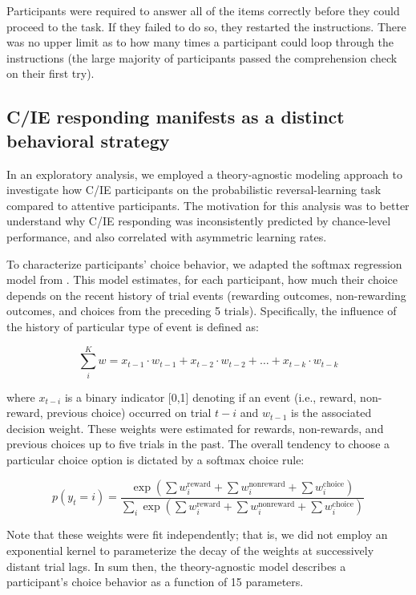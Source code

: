 \documentclass[a4paper,notitlepage,12pt]{article}
\begin{document}
Participants were required to answer all of the items correctly before they could proceed to the task. If they failed to do so, they restarted the instructions. There was no upper limit as to how many times a participant could loop through the instructions (the large majority of participants passed the comprehension check on their first try).

\subsection*{C/IE responding manifests as a distinct behavioral strategy}

In an exploratory analysis, we employed a theory-agnostic modeling approach to investigate how C/IE participants on the probabilistic reversal-learning task compared to attentive participants. The motivation for this analysis was to better understand why C/IE responding was inconsistently predicted by chance-level performance, and also correlated with asymmetric learning rates.  

To characterize participants' choice behavior, we adapted the softmax regression model from \cite{seymour2012serotonin}. This model estimates, for each participant, how much their choice depends on the recent history of trial events (rewarding outcomes, non-rewarding outcomes, and choices from the preceding 5 trials). Specifically, the influence of the history of particular type of event is defined as:

\begin{equation*}
    \sum_i^K w = x_{t-1} \cdot w_{t-1} + x_{t-2} \cdot w_{t-2} +  \ldots + x_{t-k} \cdot w_{t-k}
\end{equation*}

where $x_{t-i}$ is a binary indicator [0,1] denoting if an event (i.e., reward, non-reward, previous choice) occurred on trial $t-i$ and $w_{t-1}$ is the associated decision weight. These weights were estimated for rewards, non-rewards, and previous choices up to five trials in the past. The overall tendency to choose a particular choice option is dictated by a softmax choice rule:

\begin{equation*}
    p(y_t = i) = \frac{ \exp \left( \sum w_i^\text{reward} + \sum w_i^\text{nonreward} + \sum w_i^\text{choice} \right) }{ \sum_i \exp \left( \sum w_i^\text{reward} + \sum w_i^\text{nonreward} + \sum w_i^\text{choice} \right) }
\end{equation*}

Note that these weights were fit independently; that is, we did not employ an exponential kernel to parameterize the decay of the weights at successively distant trial lags. In sum then, the theory-agnostic model describes a participant's choice behavior as a function of 15 parameters. 
\end{document}
